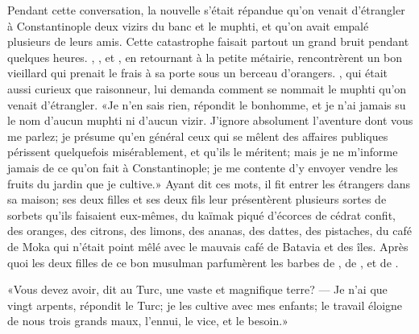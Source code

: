 Pendant cette conversation, la nouvelle s’était répandue qu’on venait
d’étrangler à Constantinople deux vizirs du banc et le muphti, et qu’on
avait empalé plusieurs de leurs amis. Cette catastrophe faisait partout
un grand bruit pendant quelques heures. , , et ,
en retournant à la petite métairie, rencontrèrent un bon vieillard qui
prenait le frais à sa porte sous un berceau d’orangers. , qui
était aussi curieux que raisonneur, lui demanda comment se nommait le
muphti qu’on venait d’étrangler. «Je n’en sais rien, répondit le
bonhomme, et je n’ai jamais su le nom d’aucun muphti ni d’aucun vizir.
J’ignore absolument l’aventure dont vous me parlez; je présume qu’en
général ceux qui se mêlent des affaires publiques périssent quelquefois
misérablement, et qu’ils le méritent; mais je ne m’informe jamais de ce
qu’on fait à Constantinople; je me contente d’y envoyer vendre les
fruits du jardin que je cultive.» Ayant dit ces mots, il fit entrer les
étrangers dans sa maison; ses deux filles et ses deux fils leur
présentèrent plusieurs sortes de sorbets qu’ils faisaient eux-mêmes, du
kaïmak piqué d’écorces de cédrat confit, des oranges, des citrons, des
limons, des ananas, des dattes, des pistaches, du café de Moka qui
n’était point mêlé avec le mauvais café de Batavia et des îles. Après
quoi les deux filles de ce bon musulman parfumèrent les barbes de
, de , et de .



«Vous devez avoir, dit  au Turc, une vaste et magnifique terre?
— Je n’ai que vingt arpents, répondit le Turc; je les cultive avec mes
enfants; le travail éloigne de nous trois grands maux, l’ennui, le
vice, et le besoin.»


